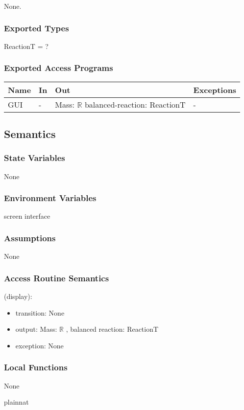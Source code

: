 \documentclass[12pt, titlepage]{article}
\begin{document}
None.
\subsubsection{Exported Types}
ReactionT = ? 
\subsubsection{Exported Access Programs}

\begin{center}
\begin{tabular}{p{2cm} p{4cm} p{4cm} p{2cm}}
\hline
\textbf{Name} & \textbf{In} & \textbf{Out} & \textbf{Exceptions} \\
\hline
{GUI} & - & Mass: $\mathbb{R}$ \newline balanced-reaction: ReactionT & - \\
\hline
\end{tabular}
\end{center}

\subsection{Semantics}

\subsubsection{State Variables}

None

\subsubsection{Environment Variables}

screen interface

\subsubsection{Assumptions}

None

\subsubsection{Access Routine Semantics}

\noindent (display):
\begin{itemize}
\item transition: None
\item output: Mass: $\mathbb{R}$ , balanced reaction:  ReactionT 
\item exception: None
\end{itemize}


\subsubsection{Local Functions}

None


 {plainnat}

\newpage
\end{document}
